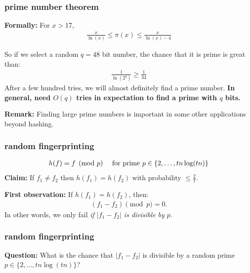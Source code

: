 \documentclass[handout,compress]{beamer}
\begin{document}
\begin{frame}
	\frametitle{prime number theorem}
	\textbf{Formally:}	For $x > 17$,
	\begin{align*}
		\frac{x}{\ln(x)} \leq	\pi(x) \leq \frac{x}{\ln(x) - 4}
	\end{align*}
	
	So if we select a random $q = 48$ bit number, the chance that it is prime is great than:
	\begin{align*}
		\frac{1}{\ln(2^{q})} \geq \frac{1}{34}
	\end{align*} 
	After a few hundred tries, we will almost definitely find a prime number. \textbf{In general, need $O(q)$ tries in expectation to find a prime with $q$ bits.}

	\textbf{Remark:} Finding large prime numbers is important in some other applications beyond hashing.
\end{frame}



\begin{frame}[t]
	\frametitle{random fingerprinting}
	\begin{align*}
		h(f) = f \pmod{p} \text{\hspace{1em} for prime } p\in \{2, \ldots, tn\log(tn)\}
	\end{align*} 
	\textbf{Claim:} If $f_1\neq f_2$ then $h(f_1) = h(f_2)$ with probability $\leq \frac{2}{t}$.
	\vspace{3em}
	
	\textbf{First observation:} If $h(f_1) = h(f_2)$, then:
	\begin{align*}
		(f_1 - f_2) \pmod{p} = 0. 
	\end{align*}
	In other words, we only fail  \emph{if $|f_1 - f_2|$ is divisible by $p$}.
	
	
\end{frame}

\begin{frame}[t]
	\frametitle{random fingerprinting}
	\textbf{Question:} What is the chance that $|f_1 - f_2|$ is divisible by a random prime $p\in \{2, \ldots, tn\log(tn)\}$?
	
\end{frame}
\end{document}
